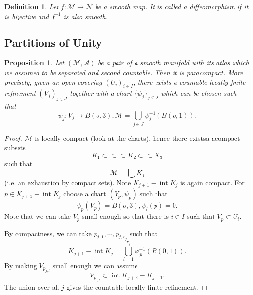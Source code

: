 \documentclass[10pt]{article}
\newtheorem{proposition}{Proposition}[section]
\newtheorem{definition}{Definition}[section]
\DeclareMathOperator{\interior}{int}
\newcommand{\compinc}[0]{\subset \subset}
\begin{document}
\begin{definition}
  Let $f:\mathcal{M}\to\mathcal{N}$ be a smooth map. It is called a diffeomorphism if it is bijective and $f^{-1}$ is also smooth.
\end{definition}
\subsection{Partitions of Unity}

\begin{proposition}
  Let $(\mathcal{M},\mathcal{A})$ be a pair of a smooth manifold with its atlas which we assumed to be separated and second countable. Then it is paracompact. More precisely, given an open covering $(U_i)_{i\in I}$, there exists a countable locally finite refinement $(V_j)_{j\in J}$ together with a chart $\{\psi_j\}_{j\in J}$ which can be chosen such that 
  \begin{equation*}
    \psi_j:V_j\to B(o,3),\mathcal{M} = \bigcup_{j\in J}\psi_j^{-1}(B(o,1)).
  \end{equation*}
  \label{smooth_manifold_paracompact}
\end{proposition}

\begin{proof}
$\mathcal{M}$ is locally compact (look at the charts), hence there existsa acompact subsets
\begin{equation*}
  K_1\subset\compinc K_2\compinc K_3
\end{equation*}
such that 
\begin{equation*}
  \mathcal{M} = \bigcup K_j
\end{equation*}
(i.e. an exhaustion by compact sets). Note $K_{j+1}-\interior K_j$ is again compact. For $p\in K_{j+1}-\interior K_j$ choose a chart $(V_p,\psi_p)$ such that 
\begin{equation*}
  \psi_p(V_p) = B(o,3), \psi_l(p) = 0.
\end{equation*}
Note that we can take $V_p$ small enough so that there is $i\in I$ such that $V_p\subset U_i$. 
\par By compactness, we can take $p_{j,1},\cdots,p_{j,r_j}$ such that 
\begin{equation*}
  K_{j+1}-\interior K_j = \bigcup_{l=1}^{r_j} \varphi_{jl}^{-1}(B(0,1)).
\end{equation*}
By making $V_{p_{j,l}}$ small enough we can assume 
\begin{equation*}
  V_{p_{j,l}}\subset\interior K_{j+2}-K_{j-1}.
\end{equation*}
The union over all $j$ gives the countable locally finite refinement.
\end{proof}
\end{document}
